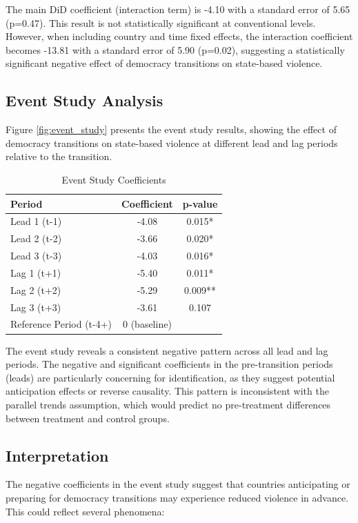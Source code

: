 \documentclass[12pt]{article}
\begin{document}
The main DiD coefficient (interaction term) is -4.10 with a standard error of 5.65 (p=0.47). This result is not statistically significant at conventional levels. However, when including country and time fixed effects, the interaction coefficient becomes -13.81 with a standard error of 5.90 (p=0.02), suggesting a statistically significant negative effect of democracy transitions on state-based violence.

\subsection{Event Study Analysis}

Figure \ref{fig:event_study} presents the event study results, showing the effect of democracy transitions on state-based violence at different lead and lag periods relative to the transition.

\begin{table}[htbp]
\centering
\caption{Event Study Coefficients}
\label{tab:event_study}
\begin{tabular}{lcc}
\toprule
Period & Coefficient & p-value \\
\midrule
Lead 1 (t-1) & -4.08 & 0.015* \\
Lead 2 (t-2) & -3.66 & 0.020* \\
Lead 3 (t-3) & -4.03 & 0.016* \\
Lag 1 (t+1) & -5.40 & 0.011* \\
Lag 2 (t+2) & -5.29 & 0.009** \\
Lag 3 (t+3) & -3.61 & 0.107 \\
\midrule
Reference Period (t-4+) & 0 (baseline) & \\
\bottomrule
\end{tabular}
\end{table}

The event study reveals a consistent negative pattern across all lead and lag periods. The negative and significant coefficients in the pre-transition periods (leads) are particularly concerning for identification, as they suggest potential anticipation effects or reverse causality. This pattern is inconsistent with the parallel trends assumption, which would predict no pre-treatment differences between treatment and control groups.

\subsection{Interpretation}

The negative coefficients in the event study suggest that countries anticipating or preparing for democracy transitions may experience reduced violence in advance. This could reflect several phenomena:
\end{document}
